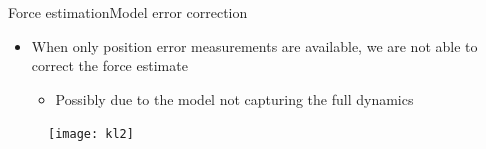 \begin{frame}{Force estimation}{Model error correction}
\begin{itemize}
\item When only position error measurements are available, we are not able to correct the force estimate
\begin{itemize}
\item Possibly due to the model not capturing the full dynamics
\end{itemize}
\end{itemize}
\begin{figure}
\centering
\texttt{[image: kl2]}
\end{figure}
\end{frame}



